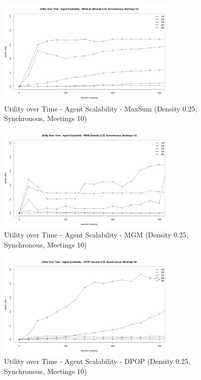 \begin{figure}[H]
\centering
\includegraphics[width=330px]{graphics/experiments/static/st_8}
\caption{Utility over Time - Agent Scalability - MaxSum (Density 0.25, Synchronous, Meetings 10)}
\label{fig:st_8}
\end{figure}
\begin{figure}[H]
\centering
\includegraphics[width=330px]{graphics/experiments/static/st_9}
\caption{Utility over Time - Agent Scalability - MGM (Density 0.25, Synchronous, Meetings 10)}
\label{fig:st_9}
\end{figure}
\begin{figure}[H]
\centering
\includegraphics[width=330px]{graphics/experiments/static/st_10}
\caption{Utility over Time - Agent Scalability - DPOP (Density 0.25, Synchronous, Meetings 10)}
\label{fig:st_10}
\end{figure}


